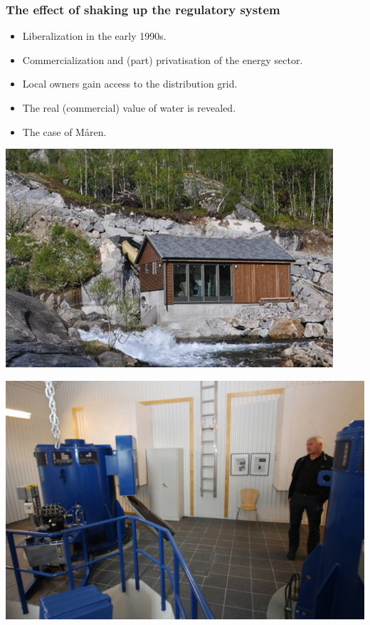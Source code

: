 \documentclass{beamer}
\begin{document}
\begin{frame}
\frametitle{The effect of shaking up the regulatory system}
\begin{itemize}
\item Liberalization in the early 1990s.
\item Commercialization and (part) privatisation of the energy sector.
\item Local owners gain access to the distribution grid.
\item The real (commercial) value of water is revealed.
\item The case of Måren.
\end{itemize}
\begin{minipage}[t]{5cm}\includegraphics[scale=0.3]{smakraft.jpg}\end{minipage}
\begin{minipage}[t]{5cm}\includegraphics[scale=0.06]{smakraftt.jpg}\end{minipage}
\end{frame}
\end{document}
